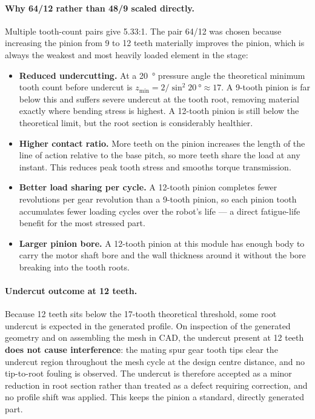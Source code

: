 \documentclass[12pt,a4paper]{article}
\begin{document}
\paragraph{Why 64/12 rather than 48/9 scaled directly.}
Multiple tooth-count pairs give \num{5.33}:1. The pair 64/12 was chosen because
increasing the pinion from 9 to 12 teeth materially improves the pinion, which
is always the weakest and most heavily loaded element in the stage:
\begin{itemize}
	\item \textbf{Reduced undercutting.} At a \SI{20}{\degree} pressure angle
	      the theoretical minimum tooth count before undercut is
	      $z_{\min} = 2/\sin^{2}\SI{20}{\degree} \approx 17$. A 9-tooth pinion
	      is far below this and suffers severe undercut at the tooth root,
	      removing material exactly where bending stress is highest. A 12-tooth
	      pinion is still below the theoretical limit, but the root section is
	      considerably healthier.
	\item \textbf{Higher contact ratio.} More teeth on the pinion increases the
	      length of the line of action relative to the base pitch, so more teeth
	      share the load at any instant. This reduces peak tooth stress and
	      smooths torque transmission.
	\item \textbf{Better load sharing per cycle.} A 12-tooth pinion completes
	      fewer revolutions per gear revolution than a 9-tooth pinion, so each
	      pinion tooth accumulates fewer loading cycles over the robot's life
	      --- a direct fatigue-life benefit for the most stressed part.
	\item \textbf{Larger pinion bore.} A 12-tooth pinion at this module has
	      enough body to carry the motor shaft bore and the wall thickness
	      around it without the bore breaking into the tooth roots.
\end{itemize}

\paragraph{Undercut outcome at 12 teeth.}
Because 12 teeth sits below the \num{17}-tooth theoretical threshold, some root
undercut is expected in the generated profile. On inspection of the generated
geometry and on assembling the mesh in CAD, the undercut present at 12 teeth
\textbf{does not cause interference}: the mating spur gear tooth tips clear the
undercut region throughout the mesh cycle at the design centre distance, and no
tip-to-root fouling is observed. The undercut is therefore accepted as a minor
reduction in root section rather than treated as a defect requiring correction,
and no profile shift was applied. This keeps the pinion a standard,
directly generated part.
\end{document}
